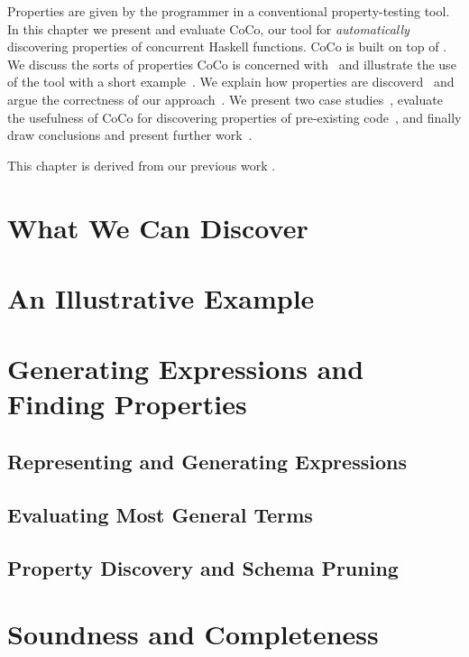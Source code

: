 Properties are given by the programmer in a conventional property-testing tool.
In this chapter we present and evaluate CoCo, our tool for \emph{automatically}
discovering properties of concurrent Haskell functions.  CoCo is built on top
of \dejafu{}.  We discuss the sorts of properties CoCo is concerned
with~ and illustrate the use of the tool with a short
example~.  We explain how properties are
discoverd~ and argue the correctness of our
approach~.  We present two case
studies~, evaluate the usefulness of CoCo for discovering
properties of pre-existing code~, and finally draw
conclusions and present further work~.

This chapter is derived from our previous work .

\section{What We Can Discover}
\label{sec:coco-scope}

\blindtext

\section{An Illustrative Example}
\label{sec:coco-example}

\blindtext

\section{Generating Expressions and Finding Properties}
\label{sec:coco-hiw}

\blindtext

\subsection{Representing and Generating Expressions}
\subsection{Evaluating Most General Terms}
\subsection{Property Discovery and Schema Pruning}

\section{Soundness and Completeness}
\label{sec:coco-correctness}

